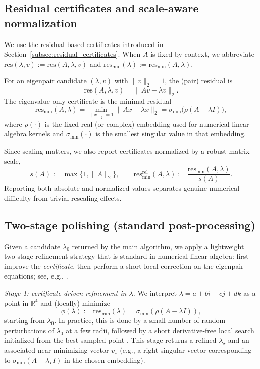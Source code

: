 \documentclass[preprint,12pt]{elsarticle}  %
\theoremstyle{definition}
\theoremstyle{definition}
\theoremstyle{definition}
\theoremstyle{definition}
\theoremstyle{definition}
\theoremstyle{remark}
\theoremstyle{remark}
\theoremstyle{remark}
\DeclareRobustCommand{\i}{\ensuremath{\mathbf{i}}}
\DeclareRobustCommand{\j}{\ensuremath{\mathbf{j}}}
\DeclareRobustCommand{\k}{\ensuremath{\mathbf{k}}}
\def\i{i}\def\j{j}\def\k{k}%
\newcommand{\RR}{\mathbb{R}}
\begin{document}
\subsection{Residual certificates and scale-aware normalization}
\label{subsec:residuals_refinement}
We use the residual-based certificates introduced in Section~\ref{subsec:residual_certificates}.
When $A$ is fixed by context, we abbreviate
$\mathrm{res}(\lambda,v):=\mathrm{res}(A,\lambda,v)$ and
$\mathrm{res}_{\min}(\lambda):=\mathrm{res}_{\min}(A,\lambda)$.

For an eigenpair candidate $(\lambda,v)$ with $\|v\|_2=1$, the (pair) residual is
\[
\mathrm{res}(A,\lambda,v)=\|Av-\lambda v\|_2.
\]
The eigenvalue-only certificate is the minimal residual
\[
\mathrm{res}_{\min}(A,\lambda)=\min_{\|x\|_2=1}\|Ax-\lambda x\|_2
=\sigma_{\min}\!\bigl(\rho(A-\lambda I)\bigr),
\]
where $\rho(\cdot)$ is the fixed real (or complex) embedding used for numerical linear-algebra kernels
and $\sigma_{\min}(\cdot)$ is the smallest singular value in that embedding.

Since scaling matters, we also report certificates normalized by a robust matrix scale,
\[
  s(A):=\max\{1,\|A\|_2\},\qquad
  \mathrm{res}_{\min}^{\mathrm{rel}}(A,\lambda):=\frac{\mathrm{res}_{\min}(A,\lambda)}{s(A)}.
\]
Reporting both absolute and normalized values separates genuine numerical difficulty from trivial rescaling effects.

\subsection{Two-stage polishing (standard post-processing)}
Given a candidate $\lambda_0$ returned by the main algorithm, we apply a light\-weight two-stage refinement strategy that is
standard in numerical linear algebra: first improve the \emph{certificate}, then perform a short local correction on the
eigenpair equations; see, e.g., \cite{GolubVanLoan2013}.

\noindent\emph{Stage 1: certificate-driven refinement in $\lambda$.}
We interpret $\lambda=a+b\i+c\j+d\k$ as a point in $\RR^4$ and (locally) minimize
\[
\phi(\lambda):=\mathrm{res}_{\min}(\lambda)=\sigma_{\min}(\rho(A-\lambda I)),
\]
starting from $\lambda_0$. In practice, this is done by a small number of random perturbations of $\lambda_0$ at a few radii,
followed by a short derivative-free local search initialized from the best sampled point \cite{NelderMead1965}. This stage returns a refined
$\lambda_\star$ and an associated near-minimizing vector $v_\star$ (e.g., a right singular vector corresponding to
$\sigma_{\min}(A-\lambda_\star I)$ in the chosen embedding).
\end{document}
